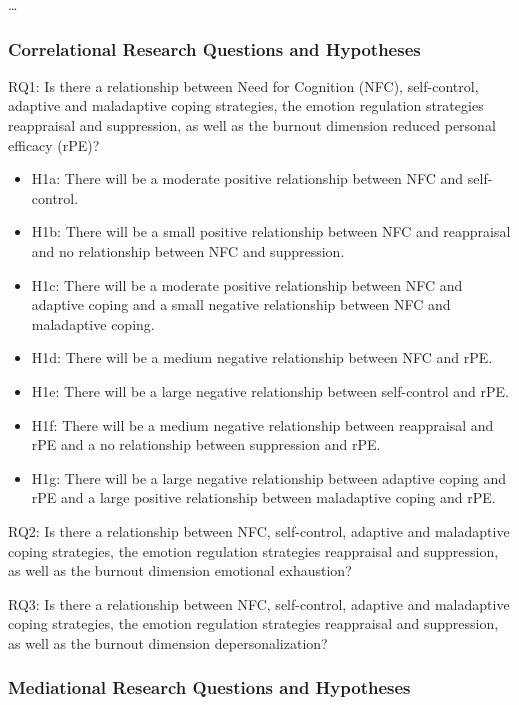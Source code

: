 \documentclass[
  man]{apa6}
\begin{document}
\ldots{}

\subsubsection{Correlational Research Questions and Hypotheses}\label{correlational-research-questions-and-hypotheses}

RQ1: Is there a relationship between Need for Cognition (NFC), self-control, adaptive and maladaptive coping strategies, the emotion regulation strategies reappraisal and suppression, as well as the burnout dimension reduced personal efficacy (rPE)?

\begin{itemize}
\item
  H1a: There will be a moderate positive relationship between NFC and self-control.
\item
  H1b: There will be a small positive relationship between NFC and reappraisal and no relationship between NFC and suppression.
\item
  H1c: There will be a moderate positive relationship between NFC and adaptive coping and a small negative relationship between NFC and maladaptive coping.
\item
  H1d: There will be a medium negative relationship between NFC and rPE.
\item
  H1e: There will be a large negative relationship between self-control and rPE.
\item
  H1f: There will be a medium negative relationship between reappraisal and rPE and a no relationship between suppression and rPE.
\item
  H1g: There will be a large negative relationship between adaptive coping and rPE and a large positive relationship between maladaptive coping and rPE.
\end{itemize}

RQ2: Is there a relationship between NFC, self-control, adaptive and maladaptive coping strategies, the emotion regulation strategies reappraisal and suppression, as well as the burnout dimension emotional exhaustion?

RQ3: Is there a relationship between NFC, self-control, adaptive and maladaptive coping strategies, the emotion regulation strategies reappraisal and suppression, as well as the burnout dimension depersonalization?

\subsubsection{Mediational Research Questions and Hypotheses}\label{mediational-research-questions-and-hypotheses}
\end{document}
